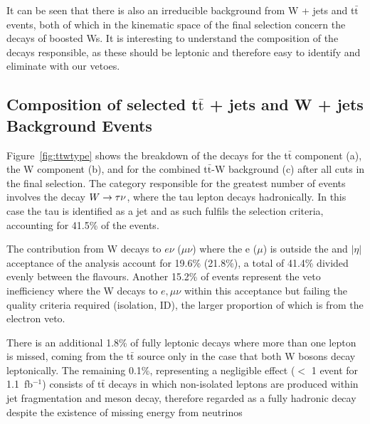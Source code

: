 It can be seen that there is also an irreducible background from W + jets and t$\bar{\textrm{t}}$ events, both of which in the kinematic space of the final selection concern the decays of boosted Ws. It is interesting to understand the composition of the decays responsible, as these should be leptonic and therefore easy to identify and eliminate with our vetoes.

\subsection{Composition of selected t$\bar{\textrm{t}}$ + jets and W + jets Background Events}
\label{sec:ttwcomp}
Figure~\ref{fig:ttwtype} shows the breakdown of the decays for the t$\bar{\textrm{t}}$ component (a), the W component (b), and for the combined t$\bar{\textrm{t}}$-W background (c) after all cuts in the final selection. The category responsible for the greatest number of events involves the decay $W \rightarrow \tau \nu$, where the tau lepton decays hadronically. In this case the tau is identified as a jet and as such fulfils the selection criteria, accounting for 41.5\% of the events.

The contribution from W decays to $e \nu$ ($\mu \nu$) where the e ($\mu$) is outside the \Pt and $|\eta|$ acceptance of the analysis account for 19.6\% (21.8\%), a total of 41.4\% divided evenly between the flavours. Another 15.2\% of events represent the veto inefficiency where the W decays to $e, \mu \nu$ within this acceptance but failing the quality criteria required (isolation, ID), the larger proportion of which is from the electron veto. 

There is an additional 1.8\% of fully leptonic decays where more than one lepton is missed, coming from the t$\bar{\textrm{t}}$ source only in the case that both W bosons decay leptonically. The remaining 0.1\%, representing a negligible effect ($<$ 1 event for 1.1~fb$^{-1}$) consists of t$\bar{\textrm{t}}$ decays in which non-isolated leptons are produced within jet fragmentation and meson decay, therefore regarded as a fully hadronic decay despite the existence of missing energy from neutrinos

